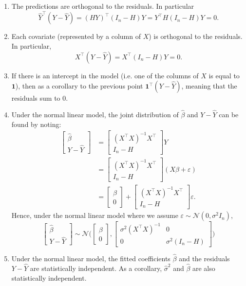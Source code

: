 \begin{enumerate}
\item The predictions are orthogonal to the residuals. In particular \[\hat{Y}^\top ( Y - \hat{Y} ) = (HY)^\top (I_n -H) Y = Y^\top H (I_n -H) Y =0.\]
\item Each covariate (represented by a column of $X$) is orthogonal to the residuals. In particular, $$X^\top (Y- \hat{Y}) = X^\top (I_n -H) Y =0.$$
\item If there is an intercept in the model (i.e. one of the columns of $X$ is equal to $\mathbf{1}$), then as a corollary to the previous point $\mathbf{1}^\top (Y-\hat{Y})$, meaning that the residuals sum to $0$.
\item Under the normal linear model, the joint distribution of $\hat{\beta}$ and $Y- \hat{Y}$ can be found by noting:
\begin{align}\label{eq:est_resid_decomp}
\begin{bmatrix} \hat{\beta} \\ Y - \hat{Y} \end{bmatrix} &= \begin{bmatrix} (X^\top  X)^{-1} X^\top  \\ I_n - H \end{bmatrix} Y\nonumber\\
& =\begin{bmatrix} (X^\top X)^{-1} X^\top \\ I_n - H \end{bmatrix} (X \beta + \varepsilon)\nonumber\\
& = \begin{bmatrix} \beta \\ 0 \end{bmatrix} +  \begin{bmatrix} (X^\top X)^{-1} X^\top \\ I_n - H \end{bmatrix} \varepsilon.
\end{align} 
Hence, under the normal linear model where we assume $\varepsilon \sim \mathcal{N} (0, \sigma^2 I_n)$, $$\begin{bmatrix} \hat{\beta} \\ Y - \hat{Y} \end{bmatrix}  \sim \mathcal{N} \Bigg( \begin{bmatrix} \beta \\ 0 \end{bmatrix} , \begin{bmatrix} \sigma^2 (X^\top  X)^{-1} & 0 \\ 0 & \sigma^2 (I_n - H) \end{bmatrix} \Bigg)$$
\item Under the normal linear model, the fitted coefficients $\hat{\beta}$ and the residuals $Y- \hat{Y}$ are statistically independent. As a corollary, $\hat{\sigma}^2$ and $\hat{\beta}$ are also statistically independent.
\end{enumerate}


